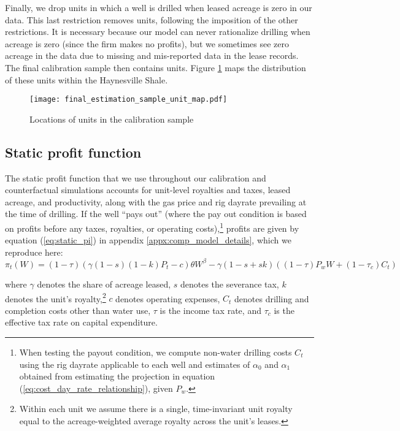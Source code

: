 \documentclass[12pt]{article}
\newcommand{\figcapt}[2][\linewidth]{
    \setcaptionwidth{#1}
    \centering
    \caption{#2}}
\begin{document}
Finally, we drop units in which a well is drilled when leased acreage is zero in our data. This last restriction removes units, following the imposition of the other restrictions. It is necessary because our model can never rationalize drilling when acreage is zero (since the firm makes no profits), but we sometimes see zero acreage in the data due to missing and mis-reported data in the lease records. The final calibration sample then contains units. Figure \ref{fig:calibration_unit_map} maps the distribution of these units within the Haynesville Shale.

\begin{figure}[!htbp]
\centering
\figcapt[\textwidth]{Locations of units in the calibration sample}
\texttt{[image: final\_estimation\_sample\_unit\_map.pdf]}
\label{fig:calibration_unit_map}
\end{figure}



\subsection{Static profit function}

The static profit function that we use throughout our calibration and counterfactual simulations accounts for unit-level royalties and taxes, leased acreage, and productivity, along with the gas price and rig dayrate prevailing at the time of drilling. If the well ``pays out'' (where the pay out condition is based on profits before any taxes, royalties, or operating costs),\footnote{When testing the payout condition, we compute non-water drilling costs $C_t$ using the rig dayrate applicable to each well and estimates of $\alpha_0$ and $\alpha_1$ obtained from estimating the projection in equation (\ref{eq:cost_day_rate_relationship}), given $P_w$.} profits are given by equation (\ref{eq:static_pi}) in appendix \ref{appx:comp_model_details}, which we reproduce here:
\begin{equation}
\pi_t(W) = (1-\tau)(\gamma(1-s)(1-k)P_t-c)\theta W^{\beta} - \gamma(1-s+sk)((1-\tau) P_w W + (1-\tau_c) C_t) 
\end{equation}

\noindent where $\gamma$ denotes the share of acreage leased, $s$ denotes the severance tax, $k$ denotes the unit's royalty,\footnote{Within each unit we assume there is a single, time-invariant unit royalty equal to the acreage-weighted average royalty across the unit's leases.} $c$ denotes operating expenses, $C_t$ denotes drilling and completion costs other than water use, $\tau$ is the income tax rate, and $\tau_c$ is the effective tax rate on capital expenditure.
\end{document}
